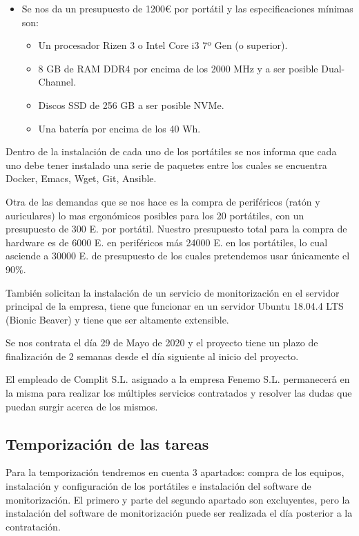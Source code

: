 \documentclass[11pt]{article}
\begin{document}
\begin{itemize}
\item Se nos da un presupuesto de 1200€ por portátil y las especificaciones mínimas son:
\begin{itemize}
\item Un procesador Rizen 3 o Intel Core i3 7º Gen (o superior).
\item 8 GB de RAM DDR4 por encima de los 2000 MHz y a ser posible Dual-Channel.
\item Discos SSD de 256 GB a ser posible NVMe.
\item Una batería por encima de los 40 Wh.
\end{itemize}
\end{itemize}

Dentro de la instalación de cada uno de los portátiles se nos informa que cada uno debe tener instalado una serie de paquetes entre los cuales se encuentra Docker, Emacs, Wget, Git, Ansible.

Otra de las demandas que se nos hace es la compra de periféricos (ratón y auriculares) lo mas ergonómicos posibles para los 20 portátiles, con un presupuesto de 300 E. por portátil. Nuestro presupuesto total para la compra de hardware es de 6000 E. en periféricos más 24000 E. en los portátiles, lo cual asciende a 30000 E. de presupuesto de los cuales pretendemos usar únicamente el 90\%.

También solicitan la instalación de un servicio de monitorización en el servidor principal de la empresa, tiene que funcionar en un servidor Ubuntu 18.04.4 LTS (Bionic Beaver) y tiene que ser altamente extensible.

Se nos contrata el día 29 de Mayo de 2020 y el proyecto tiene un plazo de finalización de 2 semanas desde el día siguiente al inicio del proyecto.

El empleado de Complit S.L. asignado a la empresa Fenemo S.L. permanecerá en la misma para realizar los múltiples servicios contratados y resolver las dudas que puedan surgir acerca de los mismos.

\subsection{Temporización de las tareas}
\label{sec:org7171964}

Para la temporización tendremos en cuenta 3 apartados: compra de los equipos, instalación y configuración de los portátiles e instalación del software de monitorización. El primero y parte del segundo apartado son excluyentes, pero la instalación del software de monitorización puede ser realizada el día posterior a la contratación.
\end{document}
